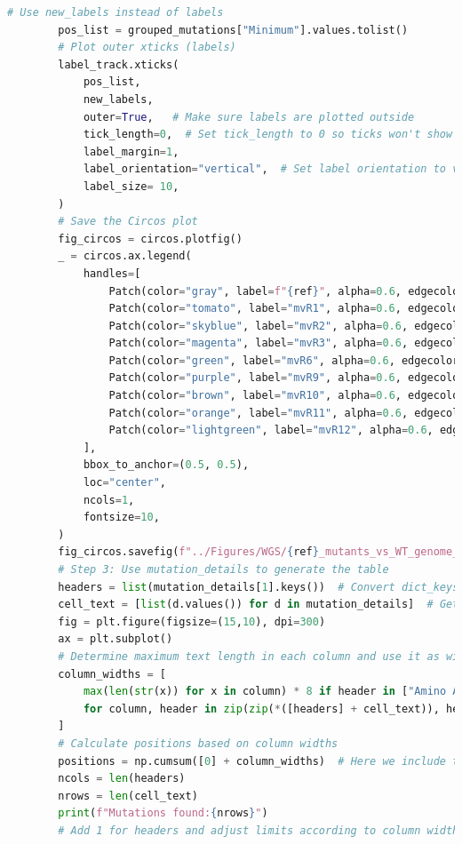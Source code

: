 \documentclass[12pt]{article}
\begin{document}
\begin{lstlisting}[language=Python]
        # Use new_labels instead of labels
        pos_list = grouped_mutations["Minimum"].values.tolist()
        # Plot outer xticks (labels)
        label_track.xticks(
            pos_list,
            new_labels,
            outer=True,   # Make sure labels are plotted outside
            tick_length=0,  # Set tick_length to 0 so ticks won't show up
            label_margin=1,
            label_orientation="vertical",  # Set label orientation to vertical
            label_size= 10,
        )
        # Save the Circos plot
        fig_circos = circos.plotfig()
        _ = circos.ax.legend(
            handles=[
                Patch(color="gray", label=f"{ref}", alpha=0.6, edgecolor="black"),
                Patch(color="tomato", label="mvR1", alpha=0.6, edgecolor="black"),
                Patch(color="skyblue", label="mvR2", alpha=0.6, edgecolor="black"),
                Patch(color="magenta", label="mvR3", alpha=0.6, edgecolor="black"),
                Patch(color="green", label="mvR6", alpha=0.6, edgecolor="black"),
                Patch(color="purple", label="mvR9", alpha=0.6, edgecolor="black"),
                Patch(color="brown", label="mvR10", alpha=0.6, edgecolor="black"),
                Patch(color="orange", label="mvR11", alpha=0.6, edgecolor="black"),
                Patch(color="lightgreen", label="mvR12", alpha=0.6, edgecolor="black"),
            ],
            bbox_to_anchor=(0.5, 0.5),
            loc="center",
            ncols=1,
            fontsize=10,
        )
        fig_circos.savefig(f"../Figures/WGS/{ref}_mutants_vs_WT_genome_views_New3.svg", dpi=600)
        # Step 3: Use mutation_details to generate the table
        headers = list(mutation_details[1].keys())  # Convert dict_keys to list
        cell_text = [list(d.values()) for d in mutation_details]  # Get cell values
        fig = plt.figure(figsize=(15,10), dpi=300)
        ax = plt.subplot()
        # Determine maximum text length in each column and use it as width
        column_widths = [
            max(len(str(x)) for x in column) * 8 if header in ["Amino Acid Change", "product"] else max(len(str(x)) for x in column) * 1
            for column, header in zip(zip(*([headers] + cell_text)), headers)  # Adding header to cell_text for each column
        ]
        # Calculate positions based on column widths
        positions = np.cumsum([0] + column_widths)  # Here we include the rightmost border
        ncols = len(headers)
        nrows = len(cell_text)
        print(f"Mutations found:{nrows}")
        # Add 1 for headers and adjust limits according to column widths

\end{lstlisting}
\end{document}
